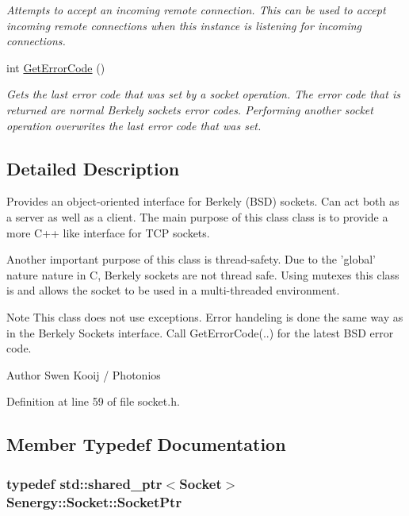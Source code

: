 \begin{DoxyCompactItemize}
\begin{DoxyCompactList}\small\item\em Attempts to accept an incoming remote connection. This can be used to accept incoming remote connections when this instance is listening for incoming connections. \end{DoxyCompactList}\item 
int \hyperlink{class_senergy_1_1_socket_a403f7a2f6c5a94d4b14f73f0965da061}{Get\-Error\-Code} ()
\begin{DoxyCompactList}\small\item\em Gets the last error code that was set by a socket operation. The error code that is returned are normal Berkely sockets error codes. Performing another socket operation overwrites the last error code that was set. \end{DoxyCompactList}\end{DoxyCompactItemize}


\subsection{Detailed Description}
Provides an object-\/oriented interface for Berkely (B\-S\-D) sockets. Can act both as a server as well as a client. The main purpose of this class class is to provide a more C++ like interface for T\-C\-P sockets. 

Another important purpose of this class is thread-\/safety. Due to the 'global' nature nature in C, Berkely sockets are not thread safe. Using mutexes this class is and allows the socket to be used in a multi-\/threaded environment.

\begin{DoxyNote}{Note}
This class does not use exceptions. Error handeling is done the same way as in the Berkely Sockets interface. Call Get\-Error\-Code(..) for the latest B\-S\-D error code.
\end{DoxyNote}
\begin{DoxyAuthor}{Author}
Swen Kooij / Photonios 
\end{DoxyAuthor}


Definition at line 59 of file socket.\-h.



\subsection{Member Typedef Documentation}
\hypertarget{class_senergy_1_1_socket_ac9ff20ce80df2d0c2900cd0940ffe860}{
\subsubsection[{Socket\-Ptr}]{\setlength{\rightskip}{0pt plus 5cm}typedef std\-::shared\-\_\-ptr$<${\bf Socket}$>$ {\bf Senergy\-::\-Socket\-::\-Socket\-Ptr}}}\label{class_senergy_1_1_socket_ac9ff20ce80df2d0c2900cd0940ffe860}


